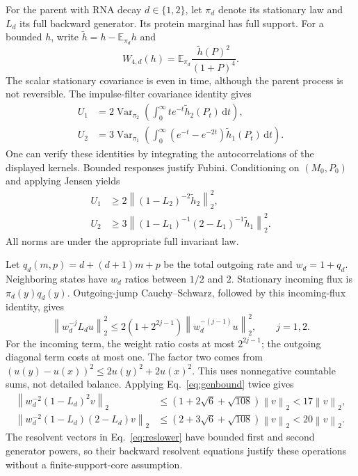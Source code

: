 \documentclass[11pt]{article}
\newcommand{\E}{\mathbb E}
\newcommand{\Var}{\operatorname{Var}}
\newcommand{\dd}{\,\mathrm dt}
\newcommand{\norm}[1]{\left\lVert #1\right\rVert}
\begin{document}
For the parent with RNA decay $d\in\{1,2\}$, let $\pi_d$ denote its
stationary law and $L_d$ its full backward generator. Its protein
marginal has full support. For a bounded $h$, write
$\widetilde h=h-\E_{\pi_d}h$ and
\begin{equation}
 W_{4,d}(h)=\E_{\pi_d}
       \frac{\widetilde h(P)^2}{(1+P)^4}.
\end{equation}
The scalar stationary covariance is even in time, although the parent
process is not reversible. The impulse-filter covariance identity gives
\begin{align}
 U_1&=2\Var_{\pi_2}
       \left(\int_0^\infty te^{-t}\widetilde h_2(P_t)\dd\right),\nonumber\\
 U_2&=3\Var_{\pi_1}
       \left(\int_0^\infty(e^{-t}-e^{-2t})
                         \widetilde h_1(P_t)\dd\right).
 \label{eq:filtervariance}
\end{align}
One can verify these identities by integrating the autocorrelations of
the displayed kernels. Bounded responses justify Fubini. Conditioning on
$(M_0,P_0)$ and applying Jensen yields
\begin{align}
 U_1&\geq2\norm{(1-L_2)^{-2}\widetilde h_2}_2^2,\nonumber\\
 U_2&\geq3\norm{(1-L_1)^{-1}(2-L_1)^{-1}\widetilde h_1}_2^2.
 \label{eq:reslower}
\end{align}
All norms are under the appropriate full invariant law.

Let $q_d(m,p)=d+(d+1)m+p$ be the total outgoing rate and
$w_d=1+q_d$. Neighboring states have $w_d$ ratios between $1/2$ and $2$.
Stationary incoming flux is $\pi_d(y)q_d(y)$. Outgoing-jump
Cauchy--Schwarz, followed by this incoming-flux identity, gives
\begin{equation}
 \norm{w_d^{-j}L_du}_2^2
 \leq2(1+2^{2j-1})\norm{w_d^{-(j-1)}u}_2^2,
 \qquad j=1,2.
 \label{eq:genbound}
\end{equation}
For the incoming term, the weight ratio costs at most $2^{2j-1}$;
the outgoing diagonal term costs at most one. The factor two comes
from $(u(y)-u(x))^2\leq2u(y)^2+2u(x)^2$.
This uses nonnegative countable sums, not detailed balance.
Applying Eq.~\eqref{eq:genbound} twice gives
\begin{align}
 \norm{w_d^{-2}(1-L_d)^2v}_2
 &\leq(1+2\sqrt6+\sqrt{108})\norm{v}_2<17\norm{v}_2,\nonumber\\
 \norm{w_d^{-2}(1-L_d)(2-L_d)v}_2
 &\leq(2+3\sqrt6+\sqrt{108})\norm{v}_2<20\norm{v}_2.
 \label{eq:productbound}
\end{align}
The resolvent vectors in Eq.~\eqref{eq:reslower} have
bounded first and second generator powers, so their backward resolvent
equations justify these operations without a finite-support-core
assumption.
\end{document}
